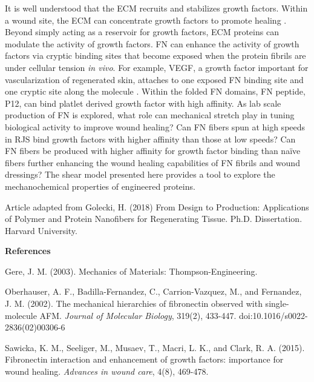 It is well understood that the ECM recruits and stabilizes growth factors. Within a wound site, the ECM can concentrate growth factors to promote healing \cite{sawicka}. Beyond simply acting as a reservoir for growth factors, ECM proteins can modulate the activity of growth factors. FN can enhance the activity of growth factors via cryptic binding sites that become exposed when the protein fibrils are under cellular tension \textit{in vivo}. For example, VEGF, a growth factor important for vascularization of regenerated skin, attaches to one exposed FN binding site and one cryptic site along the molecule \cite{sawicka}. Within the folded FN domains, FN peptide, P12, can bind platlet derived growth factor with high affinity. As lab scale production of FN is explored, what role can mechanical stretch play in tuning biological activity to improve wound healing? Can FN fibers spun at high speeds in RJS bind growth factors with higher affinity than those at low speeds? Can FN fibers be produced with higher affinity for growth factor binding than naïve fibers further enhancing the wound healing capabilities of FN fibrils and wound dressings? The shear model presented here provides a tool to explore the mechanochemical properties of engineered proteins.

Article adapted from Golecki, H. (2018) From Design to Production: Applications of Polymer and Protein Nanofibers for Regenerating Tissue. Ph.D. Dissertation. Harvard University.

\noindent
\textbf{References}
\begingroup
\renewcommand{\section}[2]{}%
\begin{thebibliography}{3}
Gere, J. M. (2003). Mechanics of Materials: Thompson-Engineering.

Oberhauser, A. F., Badilla-Fernandez, C., Carrion-Vazquez, M., and Fernandez, J. M. (2002).
The mechanical hierarchies of fibronectin observed with single-molecule AFM. 
\textit{Journal of Molecular Biology}, 319(2), 433-447. doi:10.1016/s0022-2836(02)00306-6

Sawicka, K. M., Seeliger, M., Musaev, T., Macri, L. K., and Clark, R. A. (2015). Fibronectin
interaction and enhancement of growth factors: importance for wound healing. 
\textit{Advances in wound care}, 4(8), 469-478.

\end{thebibliography}